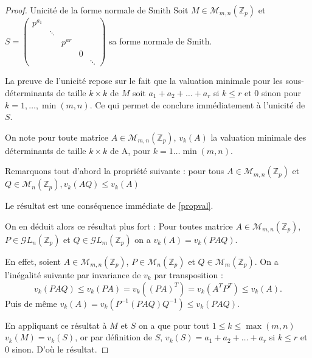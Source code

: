 	\begin{proof} Unicité de la forme normale de Smith
		Soit $M \in \mathcal{M}_{m,n}\left(\mathbb{Z}_p\right) $ et $S = \begin{pmatrix} p^{a_1} & \\
		 & \ddots \\
		 & & p^{ar}\\
		 & & & 0\\
		 & & & & \ddots \end{pmatrix} $ sa forme normale de Smith.

		La preuve de l'unicité repose sur le fait que la valuation minimale pour les sous-déterminants de taille $k\times k$ de $M$ soit $a_1 + a_2 + \ldots + a_r$ si $k\le r$ et $0$ sinon pour $k=1,\ldots, \min(m,n)$. Ce qui permet de conclure immédiatement à l'unicité de $S$.

		On note pour toute matrice $A \in \mathcal{M}_{m,n}\left(\mathbb{Z}_{p} \right) $, $v_k(A)$ la valuation minimale des déterminants de taille $k\times k$ de A, pour $k=1\ldots \min\left( m,n \right) $.

		Remarquons tout d'abord la propriété suivante : pour tous $A \in \mathcal{M}_{m,n}\left(\mathbb{Z}_p\right) $ et $Q \in \mathcal{M}_{n}\left(\mathbb{Z}_p\right), v_k(AQ) \le v_k(A)$

	Le résultat est une conséquence immédiate de \ref{propval}.

	On en déduit alors ce résultat plus fort :
	Pour toutes matrice $A \in \mathcal{M}_{m,n}\left(\mathbb{Z}_p\right) $, $P \in \mathcal{G}L_n\left( \mathbb{Z}_p \right) $ et $Q \in \mathcal{G}L_m\left( \mathbb{Z}_p \right) $ on a $v_k(A) = v_k(PAQ)$. 

	En effet, soient $A\in \mathcal{M}_{m,n}\left(\mathbb{Z}_p\right) $, $P \in \mathcal{M}_{n}\left(\mathbb{Z}_p\right) $ et $Q \in \mathcal{M}_{m}\left(\mathbb{Z}_p\right) $.
	On a l'inégalité suivante par invariance de $v_k$ par transposition :
	$$v_k(PAQ) \le v_k(PA) = v_k\left( (PA)^T \right) = v_k(A^T P^T) \le v_k(A).$$
	Puis de même $v_k(A) = v_k(P^{-1}(PAQ)Q^{-1}) \le v_k(PAQ)$.


En appliquant ce résultat à $M$ et $S$ on a que pour tout $1\le k\le \max(m,n) $ $v_k(M)  = v_k(S)$, or par définition de $S$, $v_k(S) = a_1 + a_2 + \ldots + a_r$ si $k\le r$ et $0$ sinon. D'où le résultat.

	\end{proof}
